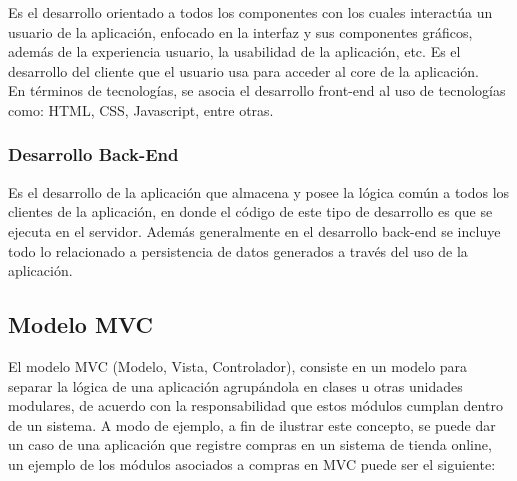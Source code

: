 Es el desarrollo orientado a todos los componentes con los cuales interactúa un usuario de la aplicación, enfocado en la interfaz y sus componentes gráficos, además de la experiencia usuario, la usabilidad de la aplicación, etc. Es el desarrollo del cliente que el usuario usa para acceder al core de la aplicación.\\

En términos de tecnologías, se asocia el desarrollo front-end al uso de tecnologías como: HTML, CSS, Javascript, entre otras.

\subsubsection{Desarrollo Back-End} %
\label{ssub:desarrollo_back_end}


Es el desarrollo de la aplicación que almacena y posee la lógica común a todos los clientes de la aplicación, en donde el código de este tipo de desarrollo es que se ejecuta en el servidor. Además generalmente en el desarrollo back-end se incluye todo lo relacionado a persistencia de datos generados a través del uso de la aplicación.


\subsection{Modelo MVC} %
\label{sub:modelo_mvc}
El modelo MVC (Modelo, Vista, Controlador)\cite{mvc}, consiste en un modelo para separar la lógica de una aplicación agrupándola en clases u otras unidades modulares, de acuerdo con la responsabilidad que estos módulos cumplan dentro de un sistema. A modo de ejemplo, a fin de ilustrar este concepto, se puede dar un caso de una aplicación que registre compras en un sistema de tienda online, un ejemplo de los módulos asociados a compras en MVC puede ser el siguiente:

